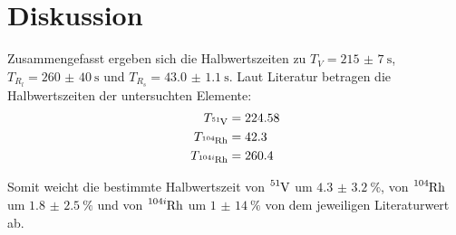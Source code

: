 \section{Diskussion}
\label{sec:Diskussion}

Zusammengefasst ergeben sich die Halbwertszeiten zu $T_V=\SI{215(7)}{\s}$, $T_{R_l}=\SI{260(40)}{\s}$ und $T_{R_s}=\SI{43.0(11)}{\s}$. Laut Literatur \cite{JLab} betragen die Halbwertszeiten der untersuchten Elemente:
\begin{align*}
    T_{\ce{^{51}V}}&=224.58  \\
    T_{\ce{^{104}Rh}}&=42.3  \\
    T_{\ce{^{104i}Rh}}&=260.4
\end{align*}

Somit weicht die bestimmte Halbwertszeit von $\ce{^{51}V}$ um $\SI{4.3(32)}{\percent}$, von $\ce{^{104}Rh}$ um $\SI{1.8(25)}{\percent}$ und von $\ce{^{104i}Rh}$ um $\SI{1(14)}{\percent}$ von dem jeweiligen Literaturwert ab.



